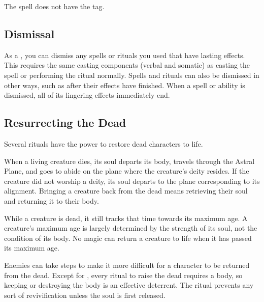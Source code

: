              The spell does not have the  tag.


    \subsection{Dismissal}
        As a , you can dismiss any spells or rituals you used that have lasting effects.
        This requires the same casting components (verbal and somatic) as casting the spell or performing the ritual normally.
        Spells and rituals can also be dismissed in other ways, such as after their effects have finished.
        When a spell or ability is dismissed, all of its lingering effects immediately end.

    \subsection{Resurrecting the Dead}\label{Resurrecting the Dead}
        Several rituals have the power to restore dead characters to life.

        When a living creature dies, its soul departs its body, travels through the Astral Plane, and goes to abide on the plane where the creature's deity resides.
        If the creature did not worship a deity, its soul departs to the plane corresponding to its alignment.
        Bringing a creature back from the dead means retrieving their soul and returning it to their body.

         While a creature is dead, it still tracks that time towards its maximum age.
        A creature's maximum age is largely determined by the strength of its soul, not the condition of its body.
        No magic can return a creature to life when it has passed its maximum age.

         Enemies can take steps to make it more difficult for a character to be returned from the dead.
        Except for , every ritual to raise the dead requires a body, so keeping or destroying the body is an effective deterrent.
        The  ritual prevents any sort of revivification unless the soul is first released.

